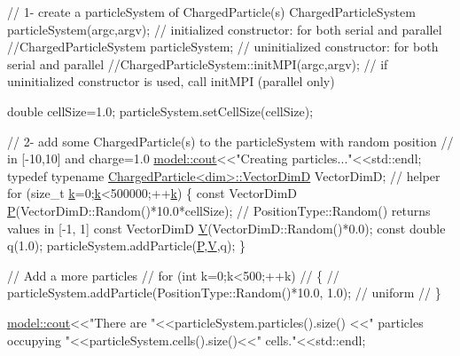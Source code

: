 \begin{DoxyCodeInclude}
    \textcolor{comment}{// 1- create a particleSystem of ChargedParticle(s)}
    ChargedParticleSystem particleSystem(argc,argv); \textcolor{comment}{// initialized constructor: for both serial and
       parallel}
    \textcolor{comment}{//ChargedParticleSystem particleSystem; // uninitialized constructor: for both serial and parallel}
    \textcolor{comment}{//ChargedParticleSystem::initMPI(argc,argv); // if uninitialized constructor is used, call initMPI
       (parallel only)}
    
    \textcolor{keywordtype}{double} cellSize=1.0;
    particleSystem.setCellSize(cellSize);
    
    \textcolor{comment}{// 2- add some ChargedParticle(s) to the particleSystem with random position}
    \textcolor{comment}{//    in [-10,10] and charge=1.0}
    \hyperlink{namespacemodel_a0ce25fef078a7d9d9cb7cfbabcfbc289}{model::cout}<<\textcolor{stringliteral}{"Creating particles..."}<<std::endl;
    \textcolor{keyword}{typedef} \textcolor{keyword}{typename} \hyperlink{classmodel_1_1_charged_particle_a31a77e0315958d087309087da65b422d}{ChargedParticle<dim>::VectorDimD} VectorDimD; \textcolor{comment}{// helper}
    \textcolor{keywordflow}{for} (\textcolor{keywordtype}{size\_t} \hyperlink{run_multipole_8m_a1c73327b2882639bc9f5e416bb3cc7ac}{k}=0;\hyperlink{run_multipole_8m_a1c73327b2882639bc9f5e416bb3cc7ac}{k}<500000;++\hyperlink{run_multipole_8m_a1c73327b2882639bc9f5e416bb3cc7ac}{k})
    \{
        \textcolor{keyword}{const} VectorDimD \hyperlink{plot_nd_a_8m_a2de865ad6dc88c711fbee00e74ed3043}{P}(VectorDimD::Random()*10.0*cellSize); \textcolor{comment}{// PositionType::Random() returns values
       in [-1, 1]}
        \textcolor{keyword}{const} VectorDimD \hyperlink{run_multipole_8m_ac0055fa4cdc19a2690bfee3643413a7d}{V}(VectorDimD::Random()*0.0);
        \textcolor{keyword}{const} \textcolor{keywordtype}{double} q(1.0);
        particleSystem.addParticle(\hyperlink{plot_nd_a_8m_a2de865ad6dc88c711fbee00e74ed3043}{P},\hyperlink{run_multipole_8m_ac0055fa4cdc19a2690bfee3643413a7d}{V},q);
    \}

    \textcolor{comment}{// Add a more particles}
\textcolor{comment}{//    for (int k=0;k<500;++k)}
\textcolor{comment}{//    \{}
\textcolor{comment}{}\textcolor{comment}{//                particleSystem.addParticle(PositionType::Random()*10.0, 1.0); // uniform}
\textcolor{comment}{//    \}}
    
    
    \hyperlink{namespacemodel_a0ce25fef078a7d9d9cb7cfbabcfbc289}{model::cout}<<\textcolor{stringliteral}{"There are "}<<particleSystem.particles().size()
    <<\textcolor{stringliteral}{" particles occupying "}<<particleSystem.cells().size()<<\textcolor{stringliteral}{" cells."}<<std::endl;
    

\end{DoxyCodeInclude}
